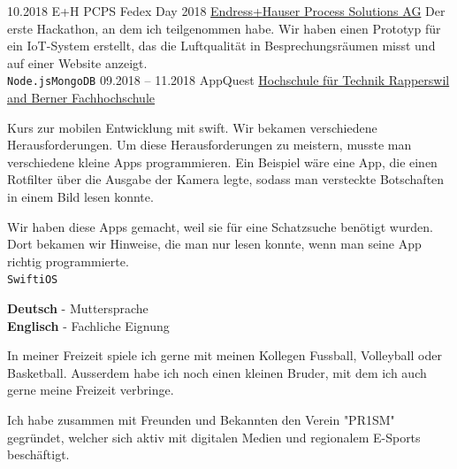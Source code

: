 \documentclass[9pt]{developercv} %
\begin{document}
\begin{entrylist}
	\entry
		{10.2018}
		{E+H PCPS Fedex Day 2018}
		{\href{https://endress.com}{Endress+Hauser Process Solutions AG}}
		{Der erste Hackathon, an dem ich teilgenommen habe. Wir haben einen Prototyp für ein IoT-System erstellt, das die Luftqualität in Besprechungsräumen misst und auf einer Website anzeigt.\\ \texttt{Node.js}\slashsep\texttt{MongoDB}}
	\entry
		{09.2018 -- 11.2018}
		{AppQuest}
		{\href{https://appquest.ch/}{Hochschule für Technik Rapperswil and Berner Fachhochschule}}
		{Kurs zur mobilen Entwicklung mit swift. Wir bekamen verschiedene Herausforderungen. Um diese Herausforderungen zu meistern, musste man verschiedene kleine Apps programmieren. Ein Beispiel wäre eine App, die einen Rotfilter über die Ausgabe der Kamera legte, sodass man versteckte Botschaften in einem Bild lesen konnte.

    Wir haben diese Apps gemacht, weil sie für eine Schatzsuche benötigt wurden. Dort bekamen wir Hinweise, die man nur lesen konnte, wenn man seine App richtig programmierte.\\ \texttt{Swift}\slashsep\texttt{iOS}}
\end{entrylist}


\begin{minipage}[t]{0.3\textwidth}
	\vspace{-\baselineskip} %

	
	\textbf{Deutsch} - Muttersprache\\
	\textbf{Englisch} - Fachliche Eignung\\
\end{minipage}
\hfill
\begin{minipage}[t]{0.3\textwidth}
	\vspace{-\baselineskip} %
	
	
	In meiner Freizeit spiele ich gerne mit meinen Kollegen Fussball, Volleyball oder Basketball. Ausserdem habe ich noch einen kleinen Bruder, mit dem ich auch gerne meine Freizeit verbringe.
\end{minipage}
\hfill
\begin{minipage}[t]{0.3\textwidth}
	\vspace{-\baselineskip} %
	
	
  Ich habe zusammen mit Freunden und Bekannten den Verein "PR1SM" gegründet, welcher sich aktiv mit digitalen Medien und regionalem E-Sports beschäftigt.
\end{minipage}

\end{document}
